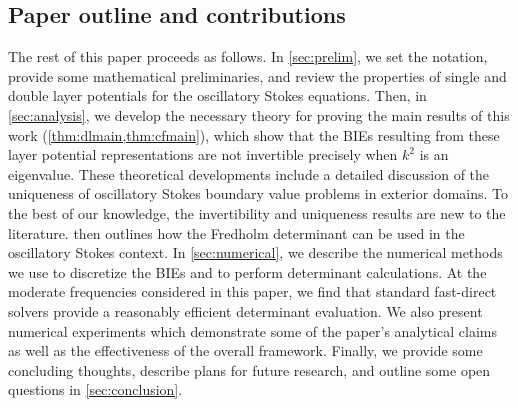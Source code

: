 \subsection{Paper outline and contributions}

The rest of this paper proceeds as follows.
%
In \cref{sec:prelim}, we set the notation, provide some
mathematical preliminaries, and review the
properties of single and double layer potentials
for the oscillatory Stokes equations.
%
Then, in \cref{sec:analysis}, we develop the necessary
theory for proving the main results of this work 
(\cref{thm:dlmain,thm:cfmain}),
which show that the BIEs resulting from these
layer potential representations are not invertible
precisely when $k^2$ is an eigenvalue.
%
These theoretical developments include a detailed
discussion of the uniqueness of oscillatory Stokes
boundary value problems in exterior domains.
%
To the best of our knowledge, the invertibility
and uniqueness results are new to the literature.
%
 then outlines how the Fredholm determinant
can be used in the oscillatory Stokes context.
%
In \cref{sec:numerical}, we describe the numerical
methods we use to discretize the BIEs and to perform
determinant calculations.
%
At the moderate frequencies considered in this
paper, we find that standard fast-direct
solvers provide a reasonably efficient determinant
evaluation.
%
We also present numerical experiments
which demonstrate some of the paper's analytical
claims as well as the effectiveness of the overall
framework.
%
Finally, we provide some concluding thoughts,
describe plans for future research,
and outline some open questions in
\cref{sec:conclusion}.
